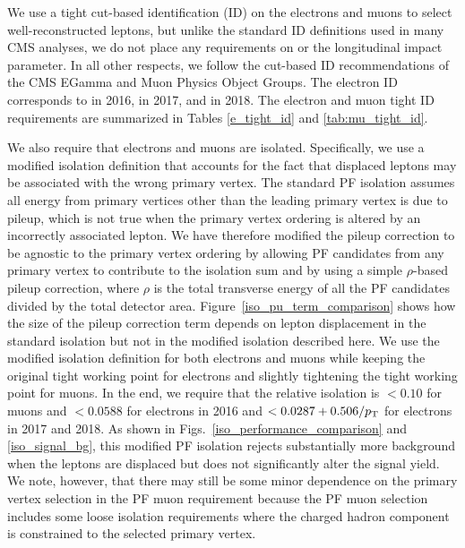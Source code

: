 



We use a tight cut-based identification (ID) on the electrons and muons to select well-reconstructed leptons, but unlike the standard ID definitions used in many CMS analyses, we do not place any requirements on \ad or the longitudinal impact parameter. In all other respects, we follow the cut-based ID recommendations of the CMS EGamma and Muon Physics Object Groups. The electron ID corresponds to  in 2016,  in 2017, and  in 2018. The electron and muon tight ID requirements are summarized in Tables \ref{e_tight_id} and \ref{tab:mu_tight_id}.




We also require that electrons and muons are isolated. Specifically, we use a modified isolation definition that accounts for the fact that displaced leptons may be associated with the wrong primary vertex. The standard PF isolation assumes all energy from primary vertices other than the leading primary vertex is due to pileup, which is not true when the primary vertex ordering is altered by an incorrectly associated lepton. We have therefore modified the pileup correction to be agnostic to the primary vertex ordering by allowing PF candidates from any primary vertex to contribute to the isolation sum and by using a simple $\rho$-based pileup correction, where $\rho$ is the total transverse energy of all the PF candidates divided by the total detector area. Figure~\ref{iso_pu_term_comparison} shows how the size of the pileup correction term depends on lepton displacement in the standard isolation but not in the modified isolation described here. We use the modified isolation definition for both electrons and muons while keeping the original tight working point for electrons and slightly tightening the tight working point for muons. In the end, we require that the relative isolation is $<0.10$ for muons and $<0.0588$ for electrons in 2016 and $<0.0287+0.506/p_{\mathrm{T}}$ for electrons in 2017 and 2018. As shown in Figs.~\ref{iso_performance_comparison} and \ref{iso_signal_bg}, this modified PF isolation rejects substantially more background when the leptons are displaced but does not significantly alter the signal yield. We note, however, that there may still be some minor dependence on the primary vertex selection in the PF muon requirement because the PF muon selection includes some loose isolation requirements where the charged hadron component is constrained to the selected primary vertex.

